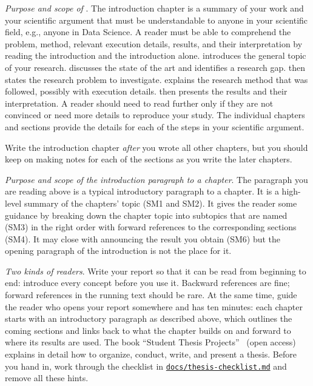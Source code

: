 \documentclass[../thesis-example-en]{subfiles}
\begin{document}
\emph{Purpose and scope of }.
The introduction chapter is a summary of your work and your scientific argument that must be understandable to anyone in your scientific field, e.g., anyone in Data Science.
A reader must be able to comprehend the problem, method, relevant execution details, results, and their interpretation by reading the introduction and the introduction alone.
 introduces the general topic of your research.
 discusses the state of the art and identifies a research gap.
 then states the research problem to investigate.
 explains the research method that was followed, possibly with execution details.
 then presents the results and their interpretation.
A reader should need to read further only if they are not convinced or need more details to reproduce your study.
The individual chapters and sections provide the details for each of the steps in your scientific argument.

Write the introduction chapter \emph{after} you wrote all other chapters, but you should keep on making notes for each of the sections as you write the later chapters.

\emph{Purpose and scope of the introduction paragraph to a chapter}.
The paragraph you are reading above is a typical introductory paragraph to a chapter.
It is a high-level summary of the chapters' topic (SM1 and SM2).
It gives the reader some guidance by breaking down the chapter topic into subtopics that are named (SM3) in the right order with forward references to the corresponding sections (SM4).
It may close with announcing the result you obtain (SM6) but the opening paragraph of the introduction is not the place for it.

\emph{Two kinds of readers}.
Write your report so that it can be read from beginning to end: introduce every concept before you use it.
Backward references are fine; forward references in the running text should be rare.
At the same time, guide the reader who opens your report somewhere and has ten minutes:
each chapter starts with an introductory paragraph as described above, which outlines the coming sections and links back to what the chapter builds on and forward to where its results are used.
The book \enquote{Student Thesis Projects}~\cite{Lichter2026} (open access) explains in detail how to organize, conduct, write, and present a thesis.
Before you hand in, work through the checklist in \href{https://github.com/latextemplates/scientific-thesis-template/blob/main/docs/thesis-checklist.md}{\texttt{docs/thesis-checklist.md}} and remove all these hints.
\end{document}
